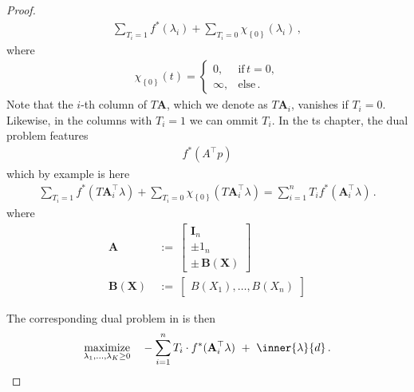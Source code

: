 \begin{proof}
\begin{gather*}
  \sum_{T_i=1} f^*(\lambda_i)
  +
  \sum_{T_i=0} 
  \chi_{\left\{ 0 \right\}}(\lambda_i)
  \,,
\end{gather*}
where
\begin{gather*}
  \chi_{\left\{ 0 \right\}}
  (t)
  =
  \begin{cases}
    0,& \text{if}\, t=0,\\
    \infty,& \text{else}\,.
  \end{cases}
\end{gather*}
Note that the $i$-th column of $T\mathbf{A}$,
which we denote as 
$T\mathbf{A}_i$,
vanishes if 
$T_i=0$. Likewise, in the columns with $T_i=1$ we can ommit $T_i$.
In the ts chapter, the dual problem features
\begin{gather}
  f^*(A^\top p)
\end{gather}
which by example is here
\begin{gather*}
  \sum_{T_i=1}  f^*(T\mathbf{A}_{ i}^\top\lambda)
  +
  \sum_{T_i=0} 
  \chi_{\left\{ 0 \right\}}
(T\mathbf{A}_{i}^\top\lambda)
  =
  \sum_{i=1}^n T_i f^*(\mathbf{A}_{ i}^\top\lambda)
  \,.
\end{gather*}
where
\begin{align*}
    \mathbf{A}
    &
    \ 
    :=
    \ 
    \begin{bmatrix}
      \mathbf{I}_n
      \\
      \pm
      \mathrm{1}_n
      \\
      \pm\,\mathbf{B}(\mathbf{X})
    \end{bmatrix}
    \\
    \mathbf{B}(\mathbf{X})
    &
    \ 
    :=
    \ 
    \begin{bmatrix}
      B(X_1), \ldots, B(X_n)
    \end{bmatrix}
\end{align*}


The corresponding dual problem in \cite{Tseng1991} is then
\begin{gather*}
  \underset
  {\lambda_1,\ldots,\lambda_{K}\ge 0}
  {
  \mathrm{maximize}
  }
  \quad
  -
  \sum_{i=1} 
  ^n
  T_i
  \cdot
  f^*
(\mathbf{A}_{ i}^\top\lambda)
  \ 
  +
  \ 
  \inner{\lambda}{d}
  \,.
\end{gather*}

\end{proof}
